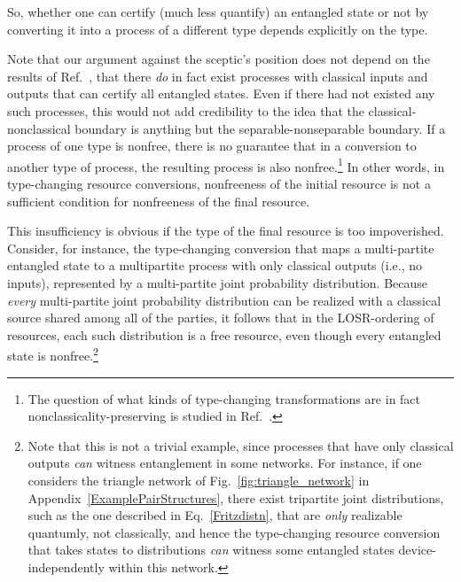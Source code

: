 \documentclass[prx,11pt,letterpaper,twocolumn,accepted=2023-11-27]{quantumarticle}
\theoremstyle{plain}
\theoremstyle{definition}
\begin{document}
So, whether one can certify (much less quantify) an entangled state or not by converting it into a process of a different type depends explicitly on the type. 

Note that our argument against the sceptic's position does not depend on the results of Ref.~\cite{bowles2018device},
that there {\em do} in fact exist processes with classical inputs and outputs that can certify all entangled states.  Even if there had not existed any such processes, this would not add credibility to the idea that the classical-nonclassical boundary is anything but the separable-nonseparable boundary.
If a process of one type is nonfree, there is no guarantee that in a conversion to another type of process, the resulting process
 is also nonfree.\footnote{The question of what kinds of type-changing transformations are in fact nonclassicality-preserving is studied in Ref.~\cite{semiquantum,rosset2020characterizing}.}
 In other words, in type-changing resource conversions, nonfreeness of the initial resource is not a sufficient condition for nonfreeness of the final resource.  
 
This insufficiency is obvious if the type of the final resource is too impoverished.  Consider, for instance, the type-changing conversion that maps a multi-partite entangled state to a multipartite process with only classical outputs (i.e., no inputs), represented by a multi-partite joint probability distribution.  Because {\em every} multi-partite joint probability distribution can be realized with a classical source shared among all of the parties, it follows that in the LOSR-ordering of resources, 
each such distribution is a free resource, even though every entangled state is nonfree.\footnote{Note that this is not a trivial example, since processes that have only classical outputs {\em can} witness entanglement in some networks. For instance, if one considers the triangle network of Fig.~\ref{fig:triangle_network} in Appendix~\ref{ExamplePairStructures},
there exist tripartite joint distributions, such as the one described in Eq.~\eqref{Fritzdistn}, that are {\em only} realizable quantumly, not classically, and hence the type-changing resource conversion that takes states to distributions {\em can} witness some entangled states device-independently within this network.}
\end{document}
